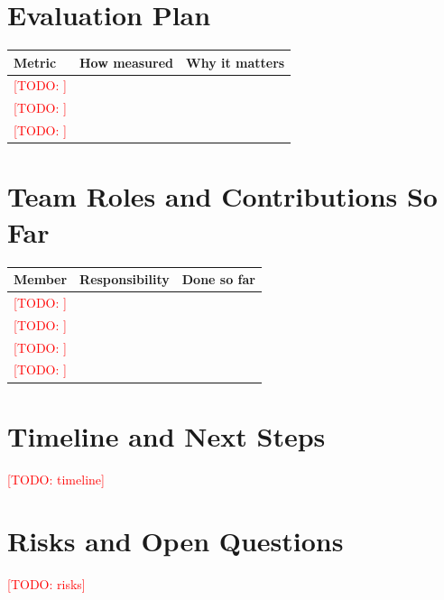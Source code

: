\documentclass[12pt]{article}
\newcommand{\todo}[1]{\textcolor{red}{[TODO: #1]}}
\begin{document}

\section{Evaluation Plan}

\begin{center}
\begin{tabular}{lll}
\toprule
Metric & How measured & Why it matters\\
\midrule
\todo{} & & \\
\todo{} & & \\
\todo{} & & \\
\bottomrule
\end{tabular}
\end{center}

\section{Team Roles and Contributions So Far}
\begin{center}
\begin{tabular}{lll}
\toprule
Member & Responsibility & Done so far\\
\midrule
\todo{} & & \\
\todo{} & & \\
\todo{} & & \\
\todo{} & & \\
\bottomrule
\end{tabular}
\end{center}

\section{Timeline and Next Steps}

\todo{timeline}

\section{Risks and Open Questions}

\todo{risks}
\end{document}
